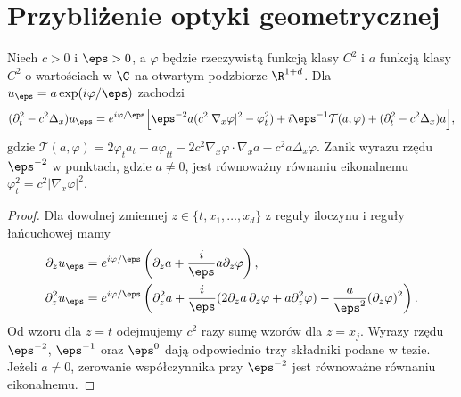 \section{Przybliżenie optyki geometrycznej}
\begin{stwierdzenie}
\label{prop:pde31-eikonal}
Niech $c>0$ i $\eps>0$, a $\varphi$ będzie
rzeczywistą funkcją klasy $C^2$ i $a$ funkcją
klasy $C^2$ o wartościach w $\C$ na otwartym
podzbiorze $\R^{1+d}$. Dla $u_\eps=a\exp(i\varphi/\eps)$
zachodzi
\[
 (\partial_t^2-c^2\Delta_x)u_\eps
 =e^{i\varphi/\eps}
 \Bigl[\eps^{-2}a(c^2|\nabla_x\varphi|^2-\varphi_t^2)
 +i\eps^{-1}\mathcal T(a,\varphi)
 +(\partial_t^2-c^2\Delta_x)a\Bigr],
\]
gdzie
$\mathcal T(a,\varphi)=2\varphi_ta_t+a\varphi_{tt}
 -2c^2\nabla_x\varphi\cdot\nabla_xa-c^2a\Delta_x\varphi$.
Zanik wyrazu rzędu $\eps^{-2}$ w punktach, gdzie $a\ne0$,
jest równoważny równaniu eikonalnemu
$\varphi_t^2=c^2|\nabla_x\varphi|^2$.
\end{stwierdzenie}
\begin{proof}
Dla dowolnej zmiennej $z\in\{t,x_1,\ldots,x_d\}$
z reguły iloczynu i reguły łańcuchowej mamy
\[
 \begin{aligned}
 \partial_z u_\eps
 &=e^{i\varphi/\eps}
 \left(\partial_z a+\frac{i}{\eps}a\partial_z\varphi\right),\\
 \partial_z^2u_\eps
 &=e^{i\varphi/\eps}
 \left(\partial_z^2 a+
 \frac{i}{\eps}(2\partial_z a\,\partial_z\varphi+
 a\partial_z^2\varphi)
 -\frac{a}{\eps^2}(\partial_z\varphi)^2\right).
 \end{aligned}
\]
Od wzoru dla $z=t$ odejmujemy $c^2$ razy sumę
wzorów dla $z=x_j$. Wyrazy rzędu $\eps^{-2}$,
$\eps^{-1}$ oraz $\eps^0$ dają odpowiednio
trzy składniki podane w tezie.
Jeżeli $a\ne0$, zerowanie współczynnika
przy $\eps^{-2}$ jest równoważne równaniu
eikonalnemu.
\end{proof}

